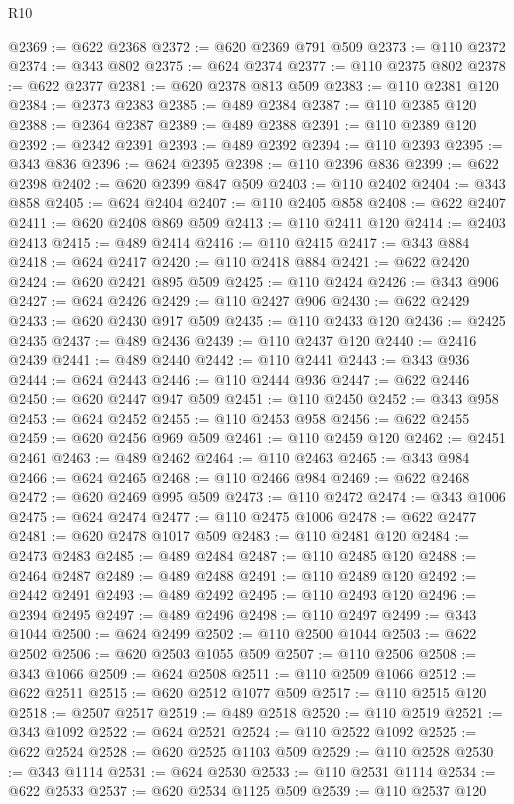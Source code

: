 \begin{lexlean}{R10}
\begin{coremodule}
{{{{{{{{{{{{{{{{{{{{{{{{{{{{{{{{{{{{{{{{{{{{{{{{{{{{{{{{{{{{{{{{{{{{{{{{{{{{{{{{{{{{@2369 := @622 @2368
@2372 := @620 @2369 @791 @509
@2373 := @110 @2372
@2374 := @343 @802
@2375 := @624 @2374
@2377 := @110 @2375 @802
@2378 := @622 @2377
@2381 := @620 @2378 @813 @509
@2383 := @110 @2381 @120
@2384 := @2373 @2383
@2385 := @489 @2384
@2387 := @110 @2385 @120
@2388 := @2364 @2387
@2389 := @489 @2388
@2391 := @110 @2389 @120
@2392 := @2342 @2391
@2393 := @489 @2392
@2394 := @110 @2393
@2395 := @343 @836
@2396 := @624 @2395
@2398 := @110 @2396 @836
@2399 := @622 @2398
@2402 := @620 @2399 @847 @509
@2403 := @110 @2402
@2404 := @343 @858
@2405 := @624 @2404
@2407 := @110 @2405 @858
@2408 := @622 @2407
@2411 := @620 @2408 @869 @509
@2413 := @110 @2411 @120
@2414 := @2403 @2413
@2415 := @489 @2414
@2416 := @110 @2415
@2417 := @343 @884
@2418 := @624 @2417
@2420 := @110 @2418 @884
@2421 := @622 @2420
@2424 := @620 @2421 @895 @509
@2425 := @110 @2424
@2426 := @343 @906
@2427 := @624 @2426
@2429 := @110 @2427 @906
@2430 := @622 @2429
@2433 := @620 @2430 @917 @509
@2435 := @110 @2433 @120
@2436 := @2425 @2435
@2437 := @489 @2436
@2439 := @110 @2437 @120
@2440 := @2416 @2439
@2441 := @489 @2440
@2442 := @110 @2441
@2443 := @343 @936
@2444 := @624 @2443
@2446 := @110 @2444 @936
@2447 := @622 @2446
@2450 := @620 @2447 @947 @509
@2451 := @110 @2450
@2452 := @343 @958
@2453 := @624 @2452
@2455 := @110 @2453 @958
@2456 := @622 @2455
@2459 := @620 @2456 @969 @509
@2461 := @110 @2459 @120
@2462 := @2451 @2461
@2463 := @489 @2462
@2464 := @110 @2463
@2465 := @343 @984
@2466 := @624 @2465
@2468 := @110 @2466 @984
@2469 := @622 @2468
@2472 := @620 @2469 @995 @509
@2473 := @110 @2472
@2474 := @343 @1006
@2475 := @624 @2474
@2477 := @110 @2475 @1006
@2478 := @622 @2477
@2481 := @620 @2478 @1017 @509
@2483 := @110 @2481 @120
@2484 := @2473 @2483
@2485 := @489 @2484
@2487 := @110 @2485 @120
@2488 := @2464 @2487
@2489 := @489 @2488
@2491 := @110 @2489 @120
@2492 := @2442 @2491
@2493 := @489 @2492
@2495 := @110 @2493 @120
@2496 := @2394 @2495
@2497 := @489 @2496
@2498 := @110 @2497
@2499 := @343 @1044
@2500 := @624 @2499
@2502 := @110 @2500 @1044
@2503 := @622 @2502
@2506 := @620 @2503 @1055 @509
@2507 := @110 @2506
@2508 := @343 @1066
@2509 := @624 @2508
@2511 := @110 @2509 @1066
@2512 := @622 @2511
@2515 := @620 @2512 @1077 @509
@2517 := @110 @2515 @120
@2518 := @2507 @2517
@2519 := @489 @2518
@2520 := @110 @2519
@2521 := @343 @1092
@2522 := @624 @2521
@2524 := @110 @2522 @1092
@2525 := @622 @2524
@2528 := @620 @2525 @1103 @509
@2529 := @110 @2528
@2530 := @343 @1114
@2531 := @624 @2530
@2533 := @110 @2531 @1114
@2534 := @622 @2533
@2537 := @620 @2534 @1125 @509
@2539 := @110 @2537 @120
}}}}}}}}}}}}}}}}}}}}}}}}}}}}}}}}}}}}}}}}}}}}}}}}}}}}}}}}}}}}}}}}}}}}}}}}}}}}}}}}}}}}
\end{coremodule}
\end{lexlean}
